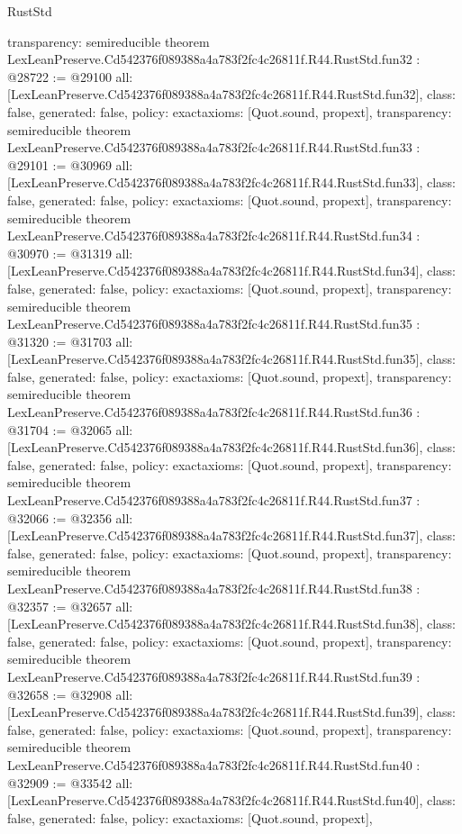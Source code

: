 \begin{lexlean}{RustStd}
\begin{coremodule}
{  transparency: semireducible
}
theorem LexLeanPreserve.Cd542376f089388a4a783f2fc4c26811f.R44.RustStd.fun32 : @28722 := @29100 {
  all: [LexLeanPreserve.Cd542376f089388a4a783f2fc4c26811f.R44.RustStd.fun32],
  class: false,
  generated: false,
  policy: exact{axioms: [Quot.sound, propext]},
  transparency: semireducible
}
theorem LexLeanPreserve.Cd542376f089388a4a783f2fc4c26811f.R44.RustStd.fun33 : @29101 := @30969 {
  all: [LexLeanPreserve.Cd542376f089388a4a783f2fc4c26811f.R44.RustStd.fun33],
  class: false,
  generated: false,
  policy: exact{axioms: [Quot.sound, propext]},
  transparency: semireducible
}
theorem LexLeanPreserve.Cd542376f089388a4a783f2fc4c26811f.R44.RustStd.fun34 : @30970 := @31319 {
  all: [LexLeanPreserve.Cd542376f089388a4a783f2fc4c26811f.R44.RustStd.fun34],
  class: false,
  generated: false,
  policy: exact{axioms: [Quot.sound, propext]},
  transparency: semireducible
}
theorem LexLeanPreserve.Cd542376f089388a4a783f2fc4c26811f.R44.RustStd.fun35 : @31320 := @31703 {
  all: [LexLeanPreserve.Cd542376f089388a4a783f2fc4c26811f.R44.RustStd.fun35],
  class: false,
  generated: false,
  policy: exact{axioms: [Quot.sound, propext]},
  transparency: semireducible
}
theorem LexLeanPreserve.Cd542376f089388a4a783f2fc4c26811f.R44.RustStd.fun36 : @31704 := @32065 {
  all: [LexLeanPreserve.Cd542376f089388a4a783f2fc4c26811f.R44.RustStd.fun36],
  class: false,
  generated: false,
  policy: exact{axioms: [Quot.sound, propext]},
  transparency: semireducible
}
theorem LexLeanPreserve.Cd542376f089388a4a783f2fc4c26811f.R44.RustStd.fun37 : @32066 := @32356 {
  all: [LexLeanPreserve.Cd542376f089388a4a783f2fc4c26811f.R44.RustStd.fun37],
  class: false,
  generated: false,
  policy: exact{axioms: [Quot.sound, propext]},
  transparency: semireducible
}
theorem LexLeanPreserve.Cd542376f089388a4a783f2fc4c26811f.R44.RustStd.fun38 : @32357 := @32657 {
  all: [LexLeanPreserve.Cd542376f089388a4a783f2fc4c26811f.R44.RustStd.fun38],
  class: false,
  generated: false,
  policy: exact{axioms: [Quot.sound, propext]},
  transparency: semireducible
}
theorem LexLeanPreserve.Cd542376f089388a4a783f2fc4c26811f.R44.RustStd.fun39 : @32658 := @32908 {
  all: [LexLeanPreserve.Cd542376f089388a4a783f2fc4c26811f.R44.RustStd.fun39],
  class: false,
  generated: false,
  policy: exact{axioms: [Quot.sound, propext]},
  transparency: semireducible
}
theorem LexLeanPreserve.Cd542376f089388a4a783f2fc4c26811f.R44.RustStd.fun40 : @32909 := @33542 {
  all: [LexLeanPreserve.Cd542376f089388a4a783f2fc4c26811f.R44.RustStd.fun40],
  class: false,
  generated: false,
  policy: exact{axioms: [Quot.sound, propext]},
}
\end{coremodule}
\end{lexlean}
